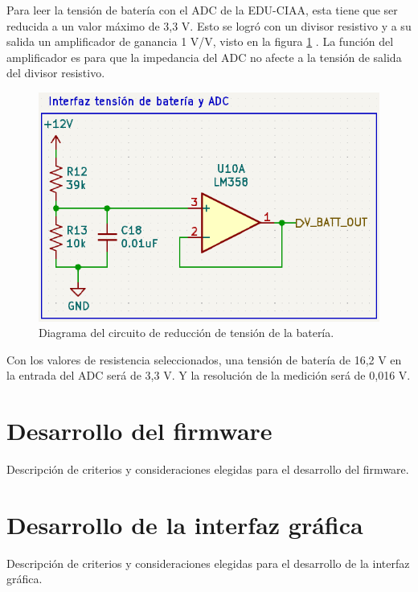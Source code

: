 Para leer la tensión de batería con el ADC de la EDU-CIAA, esta tiene que ser reducida a un valor máximo de 3,3 V. Esto se logró con un divisor resistivo y a su salida un amplificador de ganancia 1 V/V, visto en la figura \ref{fig:circuito-bat} . La función del amplificador es para que la impedancia del ADC no afecte a la tensión de salida del divisor resistivo.

\begin{figure}[htpb]
\centering
\includegraphics[width=.7\textwidth]{./Figures/ampli-bat.png}
\caption{Diagrama del circuito de reducción de tensión de la batería.}
\label{fig:circuito-bat}
\end{figure}

Con los valores de resistencia seleccionados, una tensión de batería de 16,2 V en la entrada del ADC será de 3,3 V. Y la resolución de la medición será de 0,016 V.

\section{Desarrollo del firmware}

Descripción de criterios y consideraciones elegidas para el desarrollo del firmware.

\section{Desarrollo de la interfaz gráfica}

Descripción de criterios y consideraciones elegidas para el desarrollo de la interfaz gráfica.

